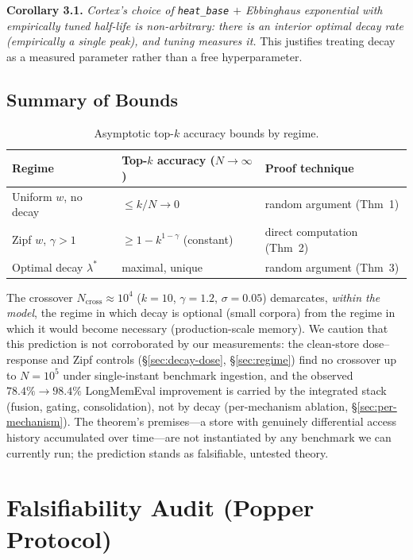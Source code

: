 \documentclass[11pt]{article}
\begin{document}
\textbf{Corollary 3.1.} \emph{Cortex's choice of
\texttt{heat\_base} $+$ Ebbinghaus exponential with empirically
tuned half-life is non-arbitrary: there is an interior optimal
decay rate (empirically a single peak), and tuning measures it.}
This justifies treating decay as a measured parameter rather than
a free hyperparameter.

\subsection{Summary of Bounds}
\label{app:erdos-summary}

\begin{table}[h]
\centering
\caption{Asymptotic top-$k$ accuracy bounds by regime.}
\label{tab:erdos-summary}
\begin{tabular}{lll}
\toprule
Regime & Top-$k$ accuracy ($N \to \infty$) & Proof technique \\
\midrule
Uniform $w$, no decay & $\le k/N \to 0$           & random argument (Thm~1) \\
Zipf $w$, $\gamma > 1$ & $\ge 1 - k^{1-\gamma}$ (constant) & direct computation (Thm~2) \\
Optimal decay $\lambda^*$ & maximal, unique       & random argument (Thm~3) \\
\bottomrule
\end{tabular}
\end{table}

The crossover $N_{\mathrm{cross}} \approx 10^4$ ($k=10$,
$\gamma=1.2$, $\sigma=0.05$) demarcates, \emph{within the model},
the regime in which decay is optional (small corpora) from the
regime in which it would become necessary (production-scale
memory).  We caution that this prediction is not corroborated by
our measurements: the clean-store dose--response and Zipf controls
(\S\ref{sec:decay-dose}, \S\ref{sec:regime}) find no crossover up
to $N = 10^5$ under single-instant benchmark ingestion, and the
observed $78.4\% \to 98.4\%$ LongMemEval improvement is carried by
the integrated stack (fusion, gating, consolidation), not by decay
(per-mechanism ablation, \S\ref{sec:per-mechanism}).  The theorem's
premises---a store with genuinely differential access history
accumulated over time---are not instantiated by any benchmark we
can currently run; the prediction stands as falsifiable, untested
theory.

\section{Falsifiability Audit (Popper Protocol)}
\label{app:popper}
\end{document}
